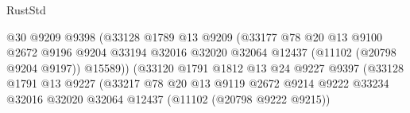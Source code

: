 \begin{lexlean}{RustStd}
\begin{coremodule}
                                              @30
                                              @9209
                                              @9398
                                              (@33128
                                                @1789
                                                @13
                                                @9209
                                                (@33177
                                                  @78
                                                  @20
                                                  @13
                                                  @9100
                                                  @2672
                                                  @9196
                                                  @9204
                                                  @33194
                                                  @32016
                                                  @32020
                                                  @32064
                                                  @12437
                                                  (@11102 (@20798 @9204 @9197))
                                                  @15589))
                                              (@33120
                                                @1791
                                                @1812
                                                @13
                                                @24
                                                @9227
                                                @9397
                                                (@33128
                                                  @1791
                                                  @13
                                                  @9227
                                                  (@33217
                                                    @78
                                                    @20
                                                    @13
                                                    @9119
                                                    @2672
                                                    @9214
                                                    @9222
                                                    @33234
                                                    @32016
                                                    @32020
                                                    @32064
                                                    @12437
                                                    (@11102 (@20798 @9222 @9215))

\end{coremodule}
\end{lexlean}

